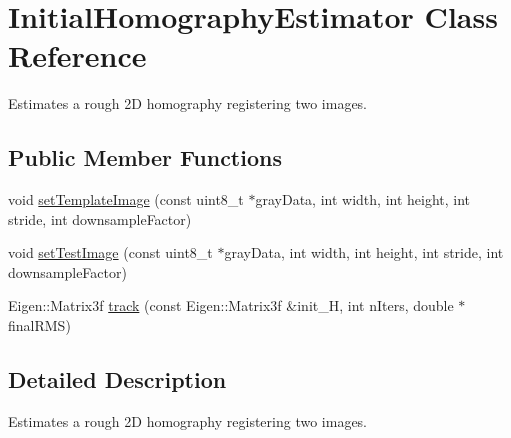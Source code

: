 \hypertarget{classfovis_1_1InitialHomographyEstimator}{
\section{InitialHomographyEstimator Class Reference}
\label{classfovis_1_1InitialHomographyEstimator}
}


Estimates a rough 2D homography registering two images.  


\subsection*{Public Member Functions}
\begin{DoxyCompactItemize}
\item 
void \hyperlink{classfovis_1_1InitialHomographyEstimator_aaa00392f56809e71fdeeb250cef2c323}{setTemplateImage} (const uint8\_\-t $\ast$grayData, int width, int height, int stride, int downsampleFactor)
\item 
void \hyperlink{classfovis_1_1InitialHomographyEstimator_a1b396c2110d51803d5993808b8c81fbf}{setTestImage} (const uint8\_\-t $\ast$grayData, int width, int height, int stride, int downsampleFactor)
\item 
Eigen::Matrix3f \hyperlink{classfovis_1_1InitialHomographyEstimator_a433869e74d5e2738425ff4292b4446bb}{track} (const Eigen::Matrix3f \&init\_\-H, int nIters, double $\ast$finalRMS)
\end{DoxyCompactItemize}


\subsection{Detailed Description}
Estimates a rough 2D homography registering two images. 

